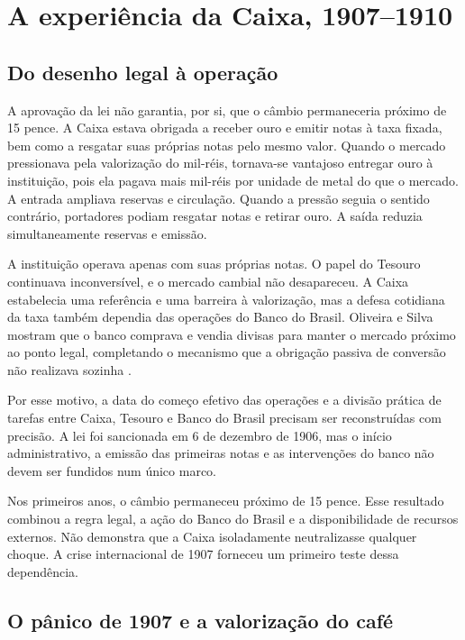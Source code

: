 \chapter{A experiência da Caixa, 1907--1910}

\section{Do desenho legal à operação}

A aprovação da lei não garantia, por si, que o câmbio permaneceria próximo de 15 pence. A Caixa estava obrigada a receber ouro e emitir notas à taxa fixada, bem como a resgatar suas próprias notas pelo mesmo valor. Quando o mercado pressionava pela valorização do mil-réis, tornava-se vantajoso entregar ouro à instituição, pois ela pagava mais mil-réis por unidade de metal do que o mercado. A entrada ampliava reservas e circulação. Quando a pressão seguia o sentido contrário, portadores podiam resgatar notas e retirar ouro. A saída reduzia simultaneamente reservas e emissão.

A instituição operava apenas com suas próprias notas. O papel do Tesouro continuava inconversível, e o mercado cambial não desapareceu. A Caixa estabelecia uma referência e uma barreira à valorização, mas a defesa cotidiana da taxa também dependia das operações do Banco do Brasil. Oliveira e Silva mostram que o banco comprava e vendia divisas para manter o mercado próximo ao ponto legal, completando o mecanismo que a obrigação passiva de conversão não realizava sozinha \cite{oliveirasilva2001}.

Por esse motivo, a data do começo efetivo das operações e a divisão prática de tarefas entre Caixa, Tesouro e Banco do Brasil precisam ser reconstruídas com precisão. A lei foi sancionada em 6 de dezembro de 1906, mas o início administrativo, a emissão das primeiras notas e as intervenções do banco não devem ser fundidos num único marco.


Nos primeiros anos, o câmbio permaneceu próximo de 15 pence. Esse resultado combinou a regra legal, a ação do Banco do Brasil e a disponibilidade de recursos externos. Não demonstra que a Caixa isoladamente neutralizasse qualquer choque. A crise internacional de 1907 forneceu um primeiro teste dessa dependência.

\section{O pânico de 1907 e a valorização do café}

